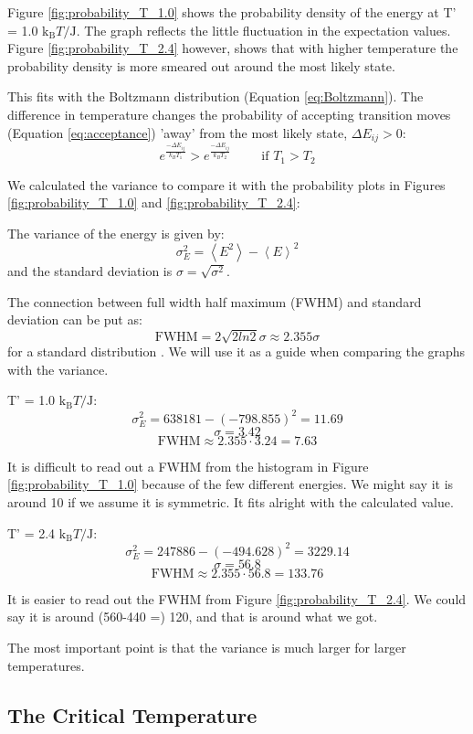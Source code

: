 Figure \ref{fig:probability_T_1.0} shows the probability density of the energy at T' = 1.0 $\text{k}_\text{B}T/\text{J}$. The graph reflects the little fluctuation in the expectation values. Figure \ref{fig:probability_T_2.4} however, shows that with higher temperature the probability density is more smeared out around the most likely state. 

This fits with the Boltzmann distribution (Equation \ref{eq:Boltzmann}). The difference in temperature changes the probability of accepting transition moves (Equation \ref{eq:acceptance}) 'away' from the most likely state, $ \Delta E_{ij} > 0$:
\[
e^\frac{-\Delta E_{ij}}{k_B T_1} > e^\frac{-\Delta E_{ij}}{k_B T_2}\hspace{1cm}\text{if } T_1 > T_2
\]

We calculated the variance to compare it with the probability plots in Figures \ref{fig:probability_T_1.0} and \ref{fig:probability_T_2.4}:

The variance of the energy is given by:
$$ \sigma_E^2 = \left< E^2\right> - \left< E\right>^2 $$
and the standard deviation is $\sigma = \sqrt{\sigma^2}$.

The connection between full width half maximum (FWHM) and standard deviation can be put as: 
$$\text{FWHM} = 2 \sqrt{2ln2} \sigma \approx 2.355 \sigma$$ 
for a standard distribution \cite{FWHM}. We will use it as a guide when comparing the graphs with the variance.

T' = 1.0 $\text{k}_\text{B}T/\text{J}$:
$$ \sigma_E^2 = 638181 - (-798.855)^2 = 11.69 $$
$$ \sigma = 3.42 $$
$$ \text{FWHM} \approx 2.355 \cdot 3.24 = 7.63 $$

It is difficult to read out a FWHM from the histogram in Figure \ref{fig:probability_T_1.0} because of the few different energies. We might say it is around 10 if we assume it is symmetric. It fits alright with the calculated value. 

T' = 2.4 $\text{k}_\text{B}T/\text{J}$:
$$ \sigma_E^2 =   247886 - (-494.628)^2 = 3229.14 $$
$$ \sigma = 56.8  $$
$$ \text{FWHM} \approx 2.355 \cdot 56.8 = 133.76 $$

It is easier to read out the FWHM from Figure \ref{fig:probability_T_2.4}. We could say it is around (560-440 =) 120, and that is around what we got.

The most important point is that the variance is much larger for larger temperatures. 

\subsection{The Critical Temperature}

